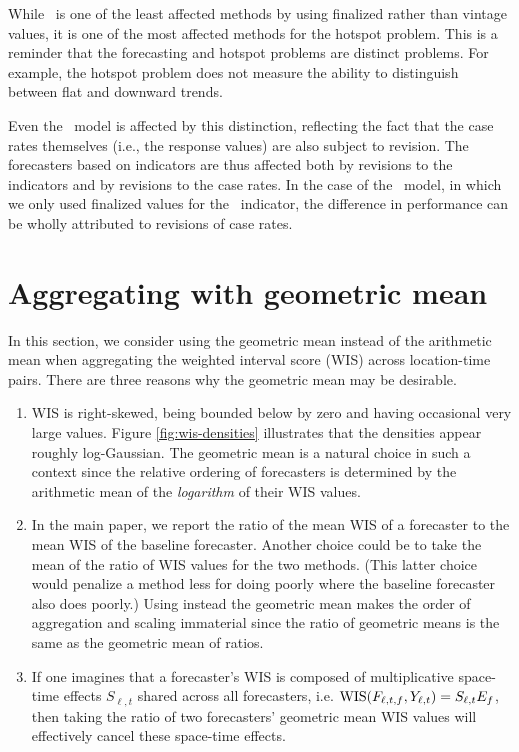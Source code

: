 While \dv~is one of the least affected methods by using finalized
rather than vintage values, it is one of the most affected methods for the hotspot problem.
This is a reminder that the forecasting and hotspot problems are
distinct problems.  For example, the hotspot problem does not measure
the ability to distinguish between flat and downward trends.

Even the \ar~model is affected by this distinction, reflecting the
fact that the case rates themselves (i.e., the response values) are also
subject to revision.  The forecasters based on indicators are thus
affected both by revisions to the indicators and by revisions to the
case rates.  In the case of the \gs~model, in which we only used finalized
values for the \gs~indicator, the difference in performance can be
wholly attributed to revisions of case rates.




\section{Aggregating with geometric mean}

In this section, we consider using the geometric mean instead of the
arithmetic mean when aggregating the weighted interval score (WIS) across location-time pairs.
There are three reasons why the geometric mean may be desirable.
\begin{enumerate}
\item  WIS is right-skewed, being bounded below by zero and having
  occasional very large values.   Figure \ref{fig:wis-densities} illustrates that the
  densities appear roughly log-Gaussian.  The geometric mean is a
  natural choice in such a context since the relative ordering of forecasters is
  determined by the arithmetic mean of the {\em logarithm} of their WIS
  values.
\item In the main paper, we report the ratio of the mean WIS of a
  forecaster to the mean WIS of the baseline forecaster. Another
  choice could be to take the mean of the ratio of WIS values for the
  two methods. (This latter choice would penalize a method less for
  doing poorly where the baseline forecaster also does poorly.)
Using instead the geometric mean makes the order of aggregation and
scaling immaterial since the ratio of geometric means is the same as
the geometric mean of ratios.
\item If one imagines that a forecaster's WIS is composed of
  multiplicative space-time effects $S_{\ell,t}$ shared across all forecasters,
  i.e. $\mathrm{WIS}(F_{\ell,t,f},Y_{\ell,t})=S_{\ell,t}E_{f}$, then
  taking the ratio of two forecasters' geometric mean WIS values will
  effectively cancel these space-time effects.
\end{enumerate}

